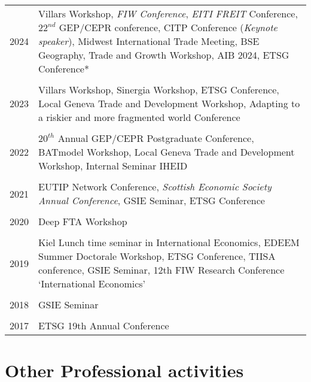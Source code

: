 \documentclass[a4paper,10pt]{article} %
\begin{document}
\begin{tabular}{r|p{11cm}}

\textsc{2024} & Villars Workshop, \textit{FIW Conference}, \textit{EITI FREIT} Conference, $22^{nd}$ GEP/CEPR conference, CITP Conference (\textit{Keynote speaker}), Midwest International Trade Meeting, BSE Geography, Trade and Growth Workshop, AIB 2024, ETSG Conference*  \\
\multicolumn{2}{c}{} \\


\textsc{2023} & Villars Workshop, Sinergia Workshop, ETSG Conference, Local Geneva Trade and Development Workshop, Adapting to a riskier and more fragmented world Conference \\
\multicolumn{2}{c}{} \\

\textsc{2022} & $20^{th}$ Annual GEP/CEPR Postgraduate Conference,  BATmodel Workshop, Local Geneva Trade and Development Workshop, Internal Seminar IHEID  \\
\multicolumn{2}{c}{} \\


\textsc{2021} &  EUTIP Network Conference, \textit{Scottish Economic Society Annual Conference}, GSIE Seminar, ETSG Conference \\
\multicolumn{2}{c}{} \\

\textsc{2020} &  Deep FTA Workshop \\
\multicolumn{2}{c}{} \\

\textsc{2019} & Kiel Lunch time seminar in International Economics, EDEEM Summer Doctorale Workshop, ETSG Conference, TIISA conference, GSIE Seminar, 12th FIW Research Conference ‘International Economics’ \\
\multicolumn{2}{c}{} \\

\textsc{2018} & GSIE Seminar  \\
\multicolumn{2}{c}{} \\

\textsc{2017} & ETSG 19th Annual Conference  \\ 
\end{tabular}


\section{\textcolor{bluegray}{Other Professional activities}}
\end{document}
